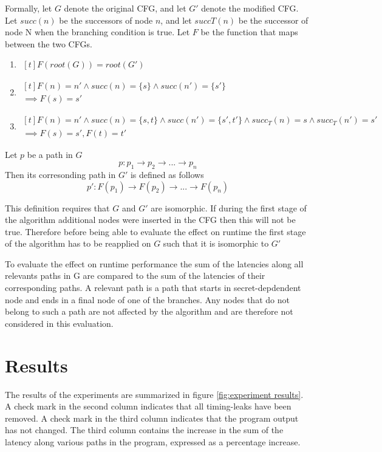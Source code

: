 Formally, let $G$ denote the original CFG, and let $G'$ denote the modified CFG. Let $succ(n)$ be the successors of node $n$, and let $succT(n)$ be 
the successor of node N when the branching condition is true. Let $F$ be the function that maps between the two CFGs.  
\begin{enumerate}
    \item $\begin{aligned}[t]
    F(root(G)) = root(G')
\end{aligned}$
\item $\begin{aligned}[t]
    F(n) = n' \land succ(n) = \{s\} \land succ(n')=\{s'\} \\ 
    \implies F(s)=s'
\end{aligned}$
\item $\begin{aligned}[t]
    F(n) = n' \land succ(n) = \{s, t\} \land succ(n')=\{s', t'\} \land succ_T(n)=s \land succ_T(n') = s'\\
    \implies F(s)=s', F(t) = t'
\end{aligned}$
\end{enumerate}
Let $p$ be a path in $G$
$$ p: p_1 \rightarrow p_2 \rightarrow ... \rightarrow p_n$$
Then its corresonding path in $G'$ is defined as follows 
$$ p': F(p_1) \rightarrow F(p_2) \rightarrow ... \rightarrow F(p_n)$$

This definition requires that $G$ and $G'$ are isomorphic. If during the first stage of the algorithm additional nodes were inserted in the CFG
then this will not be true. Therefore before being able to evaluate the effect on runtime the first stage of the algorithm has to be reapplied on $G$ such 
that it is isomorphic to $G'$

To evaluate the effect on runtime performance the sum of the latencies along all relevants paths in G are compared to the sum of the latencies of their corresponding paths. A relevant path is a path that starts in secret-depdendent node and ends in a final node of one of the branches. Any nodes that do not belong to such a path 
are not affected by the algorithm and are therefore not considered in this evaluation. 

    
\section{Results}
\label{sec:results}
The results of the experiments are summarized in figure \ref{fig:experiment results}.
A check mark in the second column indicates that all timing-leaks have been removed. 
A check mark in the third column indicates that the program output has not changed. 
The third column contains the increase in the sum of the latency along various paths in the program, expressed as a percentage increase.


